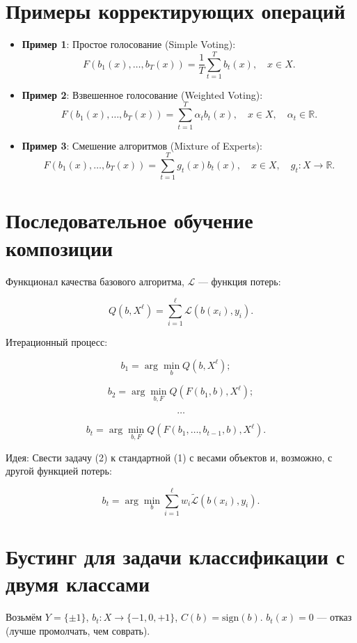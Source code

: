 \section*{Примеры корректирующих операций}

\begin{itemize}
    \item \textbf{Пример 1}: Простое голосование (Simple Voting):
    \[
    F(b_1(x), \ldots, b_T(x)) = \frac{1}{T} \sum_{t=1}^T b_t(x), \quad x \in X.
    \]

    \item \textbf{Пример 2}: Взвешенное голосование (Weighted Voting):
    \[
    F(b_1(x), \ldots, b_T(x)) = \sum_{t=1}^T \alpha_t b_t(x), \quad x \in X, \quad \alpha_t \in \mathbb{R}.
    \]

    \item \textbf{Пример 3}: Смешение алгоритмов (Mixture of Experts):
    \[
    F(b_1(x), \ldots, b_T(x)) = \sum_{t=1}^T g_t(x) b_t(x), \quad x \in X, \quad g_t: X \rightarrow \mathbb{R}.
    \]
\end{itemize}

\section*{Последовательное обучение композиции}

Функционал качества базового алгоритма, \(\mathcal{L}\) — функция потерь:

\[
Q(b, X^\ell) = \sum_{i=1}^\ell \mathcal{L}(b(x_i), y_i).
\]

Итерационный процесс:

\[
b_1 = \arg \min_{b} Q(b, X^\ell); \quad \tag{1}
\]

\[
b_2 = \arg \min_{b, F} Q(F(b_1, b), X^\ell);
\]

\[
\ldots
\]

\[
b_t = \arg \min_{b, F} Q(F(b_1, \ldots, b_{t-1}, b), X^\ell). \quad \tag{2}
\]

Идея: Свести задачу (2) к стандартной (1) с весами объектов и, возможно, с другой функцией потерь:

\[
b_t = \arg \min_{b} \sum_{i=1}^\ell w_i \tilde{\mathcal{L}}(b(x_i), y_i).
\]

\section*{Бустинг для задачи классификации с двумя классами}

Возьмём \( Y = \{\pm1\} \), \( b_t: X \rightarrow \{-1, 0, +1\} \), \( C(b) = \text{sign}(b) \).
\( b_t(x) = 0 \) — отказ (лучше промолчать, чем соврать).

